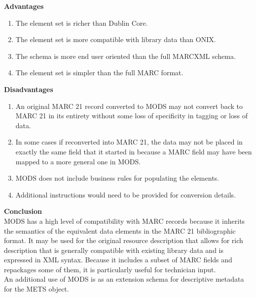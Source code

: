 \begin{enumerate}
	{\bf Advantages}
	\begin{enumerate}
		\item The element set is richer than Dublin Core.
		\item The element set is more compatible with library data than ONIX.
		\item The schema is more end user oriented than the full MARCXML schema.
		\item The element set is simpler than the full MARC format. 
	\end{enumerate}	
	{\bf Disadvantages}
	\begin{enumerate}
		\item An original MARC 21 record converted to MODS may not convert back to MARC 21 in its entirety without some loss of specificity in tagging or loss of data.
		\item In some cases if reconverted into MARC 21, the data may not be placed in exactly the same field that it started in because a MARC field may have been mapped to a more general one in MODS.
		\item MODS does not include business rules for populating the elements.
		\item Additional instructions would need to be provided for conversion details.
	\end{enumerate}
	{\bf Conclusion}\\
	MODS has a high level of compatibility with MARC records because it inherits the semantics of the equivalent data elements in the MARC 21 bibliographic format. 
	It may be used for the original resource description that allows for rich description that is generally compatible with existing library data and is expressed in XML syntax. 
	Because it includes a subset of MARC fields and repackages some of them, it is particularly useful for technician input.\\
	An additional use of MODS is as an extension schema for descriptive metadata for the METS object.
	
	

\end{enumerate}
